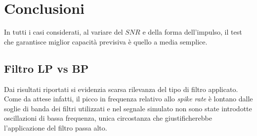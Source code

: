 \documentclass[9pt,twocolumn,twoside]{osajnl}
\begin{document}
%



\section{Conclusioni}
\label{conclusioni}

In tutti i casi considerati, al variare del $SNR$ e della forma dell'impulso, il test che garantisce miglior capacità previsiva è quello a media semplice.

\subsection{Filtro LP vs BP}
Dai risultati riportati si evidenzia scarsa rilevanza del tipo di filtro applicato. Come da attese infatti, il picco in frequenza relativo allo {\it spike rate} è lontano dalle soglie di banda dei filtri utilizzati e nel segnale simulato non sono state introdotte oscillazioni di bassa frequenza, unica circostanza che giustificherebbe l'applicazione del filtro passa alto.
\end{document}
